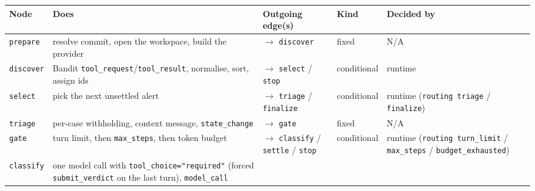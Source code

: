 \documentclass[
  10pt,
]{article}
\newcounter{none} %
\begin{document}
{\def\LTcaptype{none} %
\begin{longtable}[]{@{}
  >{\raggedright\arraybackslash}p{}
  >{\raggedright\arraybackslash}p{}
  >{\raggedright\arraybackslash}p{}
  >{\raggedright\arraybackslash}p{}
  >{\raggedright\arraybackslash}p{}@{}}
\toprule\noalign{}
\begin{minipage}[b]{\linewidth}\raggedright
Node
\end{minipage} & \begin{minipage}[b]{\linewidth}\raggedright
Does
\end{minipage} & \begin{minipage}[b]{\linewidth}\raggedright
Outgoing edge(s)
\end{minipage} & \begin{minipage}[b]{\linewidth}\raggedright
Kind
\end{minipage} & \begin{minipage}[b]{\linewidth}\raggedright
Decided by
\end{minipage} \\
\midrule\noalign{}
\endhead
\bottomrule\noalign{}
\endlastfoot
\texttt{prepare} & resolve commit, open the workspace, build the
provider & \ensuremath{\rightarrow} \texttt{discover} & fixed & N/A \\
\texttt{discover} & Bandit \texttt{tool\_request}/\texttt{tool\_result},
normalise, sort, assign ids & \ensuremath{\rightarrow} \texttt{select} / \texttt{stop} &
conditional & runtime \\
\texttt{select} & pick the next unsettled alert & \ensuremath{\rightarrow} \texttt{triage} /
\texttt{finalize} & conditional & runtime (\texttt{routing\ triage} /
\texttt{finalize}) \\
\texttt{triage} & per-case withholding, context message,
\texttt{state\_change} & \ensuremath{\rightarrow} \texttt{gate} & fixed & N/A \\
\texttt{gate} & turn limit, then \texttt{max\_steps}, then token budget
& \ensuremath{\rightarrow} \texttt{classify} / \texttt{settle} / \texttt{stop} & conditional &
runtime (\texttt{routing\ turn\_limit} / \texttt{max\_steps} /
\texttt{budget\_exhausted}) \\
\texttt{classify} & one model call with \texttt{tool\_choice="required"}
(forced \texttt{submit\_verdict} on the last turn), \texttt{model\_call}

\end{longtable}}
\end{document}
